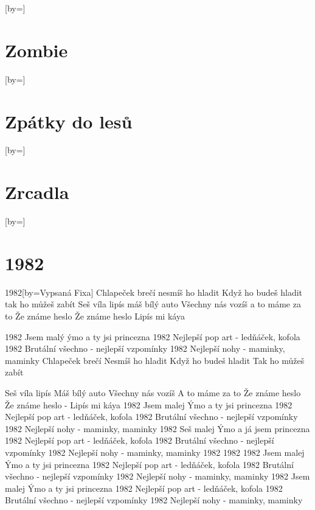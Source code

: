 \documentclass{article}
\begin{document}
\begin{songs}{}
\begin{song}{}[by={}]
\endverse
\end{song}

\section{Zombie}
\begin{song}{}[by={}]
\beginverse

\endverse
\end{song}

\section{Zpátky do lesů}
\begin{song}{}[by={}]
\beginverse

\endverse
\end{song}

\section{Zrcadla}
\begin{song}{}[by={}]
\beginverse

\endverse
\end{song}

\section{1982}
\begin{song}{1982}[by={Vypsaná Fixa}]
\beginverse
Chlapeček brečí nesmíš ho hladit
Když ho budeš hladit tak ho můžeš zabít
Seš víla lipís máš bílý auto
Všechny nás vozíš a to máme za to
Že známe heslo
Že známe heslo
Lipís mi káya

1982
Jsem malý ýmo a ty jsi princezna
1982
Nejlepší pop art - ledňáček, kofola
1982
Brutální všechno - nejlepší vzpomínky
1982
Nejlepší nohy - maminky, maminky
Chlapeček brečí
Nesmíš ho hladit
Když ho budeš hladit
Tak ho můžeš zabít

Seš víla lipís
Máš bílý auto
Všechny nás vozíš
A to máme za to
Že známe heslo
Že známe heslo
- Lipís mi káya
1982
Jsem malej Ýmo a ty jsi princezna
1982
Nejlepší pop art - ledňáček, kofola
1982
Brutální všechno - nejlepší vzpomínky
1982
Nejlepší nohy - maminky, maminky
1982
Seš malej Ýmo a já jsem princezna
1982
Nejlepší pop art - ledňáček, kofola
1982
Brutální všechno - nejlepší vzpomínky
1982
Nejlepší nohy - maminky, maminky
1982
1982
1982
Jsem malej Ýmo a ty jsi princezna
1982
Nejlepší pop art - ledňáček, kofola
1982
Brutální všechno - nejlepší vzpomínky
1982
Nejlepší nohy - maminky, maminky
1982
Jsem malej Ýmo a ty jsi princezna
1982
Nejlepší pop art - ledňáček, kofola
1982
Brutální všechno - nejlepší vzpomínky
1982
Nejlepší nohy - maminky, maminky
\endverse
\end{song}


\end{songs}
\end{document}
